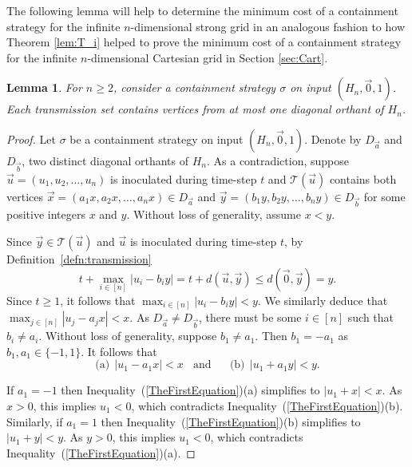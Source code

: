 \documentclass[unknownkeysallowed]{article}
\newtheorem{lemma}[theorem]{Lemma}
\theoremstyle{definition}\newtheorem{strategy}{Strategy}
\theoremstyle{definition}\newtheorem{notation}{Notation}[theorem]
\begin{document}
The following lemma will help to determine the minimum cost of a containment strategy for the infinite $n$-dimensional strong grid in an analogous fashion to how Theorem \ref{lem:T_i} helped to prove the minimum cost of a containment strategy for the infinite $n$-dimensional Cartesian grid in Section \ref{sec:Cart}. 

\begin{lemma} \label{lem:oneOrth} For $n \geq 2$, consider a containment strategy $\sigma$ on input $(H_n,\vec{0},1)$.  Each transmission set contains vertices from at most one diagonal orthant of $H_n$.
\end{lemma}

\begin{proof} Let $\sigma$ be a containment strategy on input $(H_n,\vec{0},1)$.  Denote by $D_{\vec{a}}$ and $D_{\vec{b}}$, two distinct diagonal orthants of $H_n$. As a contradiction, suppose $\vec{u} = (u_1,u_2,\dots,u_n)$ is inoculated during time-step $t$ and $\mathcal{T}(\vec{u})$ contains both vertices $\vec{x} = (a_1x,a_2x,\dots,a_nx) \in D_{\vec{a}}$ and $\vec{y} = (b_1y,b_2y,\dots,b_ny) \in D_{\vec{b}}$ for some positive integers $x$ and $y$. Without loss of generality, assume $x < y$. 

Since $\vec{y} \in \mathcal{T}(\vec{u})$ and $\vec{u}$ is inoculated during time-step $t$, by Definition~\ref{defn:transmission} $$t+\max_{i \in [n]} |u_i-b_iy| =t+d(\vec{u},\vec{y}) \leq  d(\vec{0},\vec{y}) = y.$$ Since $t \geq 1$, it follows that $\max_{i \in [n]}|u_i-b_iy| < y$.  We similarly deduce that $\max_{j \in [n]} |u_j - a_jx| < x$.   As $D_{\vec{a}} \ne D_{\vec{b}}$, there must be some $i \in [n]$ such that $b_i \ne a_i$. Without loss of generality, suppose $b_1 \ne a_1$. Then $b_1=-a_1$ as $b_1,a_1 \in \{-1,1\}$.  It follows that \begin{equation}\label{TheFirstEquation} \text{(a)}~~|u_1-a_1x|<x ~~~~\text{and~~~~ (b)}~~|u_1+a_1y|<y.\end{equation}

If $a_1=-1$ then Inequality~(\ref{TheFirstEquation})(a) simplifies to $|u_1+x|<x$.  As $x>0$, this implies $u_1<0$, which contradicts Inequality~(\ref{TheFirstEquation})(b).  Similarly, if $a_1=1$ then Inequality~(\ref{TheFirstEquation})(b) simplifies to $|u_1+y|<y$.  As $y>0$, this implies $u_1<0$, which contradicts Inequality~(\ref{TheFirstEquation})(a).
\end{proof}
\end{document}
